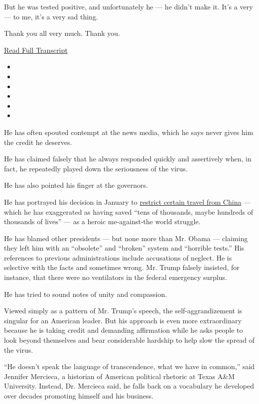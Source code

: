 But he was tested positive, and unfortunately he --- he didn't make it.
It's a very --- to me, it's a very sad thing.

Thank you all very much. Thank you.

\href{https://www.whitehouse.gov/briefings-statements/remarks-president-trump-vice-president-pence-members-coronavirus-task-force-press-briefing-25/}{Read
Full Transcript}

\begin{itemize}
\item
\item
\item
\item
\item
\item
\end{itemize}

He has often spouted contempt at the news media, which he says never
gives him the credit he deserves.

He has claimed falsely that he always responded quickly and assertively
when, in fact, he repeatedly played down the seriousness of the virus.

He has also pointed his finger at the governors.

He has portrayed his decision in January to
\href{https://www.nytimes3xbfgragh.onion/2020/04/04/us/coronavirus-china-travel-restrictions.html}{restrict
certain travel from China} --- which he has exaggerated as having saved
``tens of thousands, maybe hundreds of thousands of lives'' --- as a
heroic me-against-the world struggle.

He has blamed other presidents --- but none more than Mr. Obama ---
claiming they left him with an ``obsolete'' and ``broken'' system and
``horrible tests.'' His references to previous administrations include
accusations of neglect. He is selective with the facts and sometimes
wrong. Mr. Trump falsely insisted, for instance, that there were no
ventilators in the federal emergency surplus.

He has tried to sound notes of unity and compassion.

Viewed simply as a pattern of Mr. Trump's speech, the
self-aggrandizement is singular for an American leader. But his approach
is even more extraordinary because he is taking credit and demanding
affirmation while he asks people to look beyond themselves and bear
considerable hardship to help slow the spread of the virus.

``He doesn't speak the language of transcendence, what we have in
common,'' said Jennifer Mercieca, a historian of American political
rhetoric at Texas A\&M University. Instead, Dr. Mercieca said, he falls
back on a vocabulary he developed over decades promoting himself and his
business.

